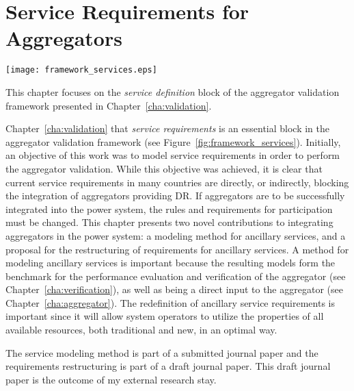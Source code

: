 \chapter{Service Requirements for Aggregators} %
\label{cha:services}
\begin{marginfigure}
	\texttt{[image: framework\_services.eps]}
	\caption{This chapter focuses on the \emph{service definition} block of the aggregator validation framework presented in Chapter~\ref{cha:validation}.}
      \label{fig:framework_services}
\end{marginfigure}
 Chapter~\ref{cha:validation} that \emph{service requirements} is an essential block in the aggregator validation framework (see Figure~\ref{fig:framework_services}). Initially, an objective of this work was to model service requirements in order to perform the aggregator validation. While this objective was achieved, it is clear that current service requirements in many countries are directly, or indirectly, blocking the integration of aggregators providing DR. If aggregators are to be successfully integrated into the power system, the rules and requirements for participation must be changed. This chapter presents two novel contributions to integrating aggregators in the power system: a modeling method for ancillary services, and a proposal for the restructuring of requirements for ancillary services. A method for modeling ancillary services is important because the resulting models form the benchmark for the performance evaluation and verification of the aggregator (see Chapter~\ref{cha:verification}), as well as being a direct input to the aggregator (see Chapter~\ref{cha:aggregator}). The redefinition of ancillary service requirements is important since it will allow system operators to utilize the properties of all available resources, both traditional and new, in an optimal way.

The service modeling method is part of a submitted journal paper and the requirements restructuring is part of a draft journal paper. This draft journal paper is the outcome of my external research stay.


